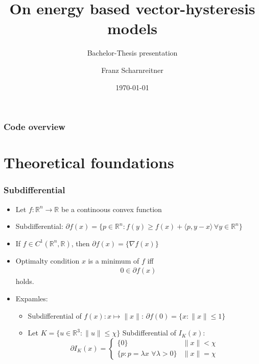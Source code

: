 \documentclass[utf8,aspectratio=169,ngerman,english]{beamer}
\begin{document}
\title{On energy based vector-hysteresis models}

\subtitle{Bachelor-Thesis presentation}

\author{Franz Scharnreitner}



\date{\today}

\maketitle


\begin{frame}
\frametitle{Code overview}
 \tableofcontents
\end{frame}

\section{Theoretical foundations}
\begin{frame}
 \frametitle{Subdifferential}

 \begin{itemize}
    \item Let $f: \mathbb R^n \to \mathbb R$ be a continoous convex function
    \item Subdifferential: $\partial f(x) = \{p \in \mathbb R^n: f(y) \geq f(x) + \langle p, y - x \rangle \, \forall y \in \mathbb R^n\}$
    \item If $f \in C^1(\mathbb R^n,\mathbb R)$, then $\partial f(x) = \{\nabla f(x)\}$
     \item Optimalty condition $x$ is a minimum of $f$ iff \begin{align}
                                                        0 \in \partial f(x)
                                                       \end{align}
        holds.
    \item Expamles:
     \begin{itemize}
      \item Subdifferential of $f(x): x \mapsto \|x\|$: $\partial f(0) = \{x : \|x\| \leq 1 \}$
      \item Let $K = \{u \in \mathbb R^3 : \|u\| \leq \chi \} $ Subdifferential of $I_K(x):$
      $$\partial I_K(x) = \begin{cases}\{0\} & \|x\| < \chi \\ \{p : p = \lambda x \,\, \forall \lambda > 0 \} & \|x\| = \chi \end{cases}$$
     \end{itemize}



 \end{itemize}

\end{frame}
\end{document}

